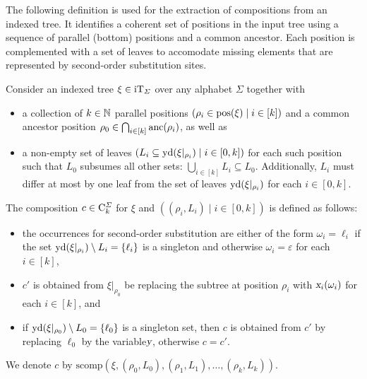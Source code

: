 \documentclass[../../document.tex]{subfiles}
\begin{document}
    The following definition is used for the extraction of  compositions from an indexed tree.
    It identifies a coherent set of positions in the input tree using a sequence of parallel (bottom) positions and a common ancestor.
    Each position is complemented with a set of leaves to accomodate missing elements that are represented by second-order substitution sites.

    \begin{definition}\label{def:dcp:comp}
        Consider an indexed tree \(\xi \in \operatorname{iT}_{\varSigma}\) over any alphabet \(\varSigma\) together with
        \begin{itemize}
            \item
                a collection of \(k \in \mathbb{N}\) parallel positions \((\rho_i \in \operatorname{pos}(\xi) \mid i \in [k])\) and
                a common ancestor position \(\rho_0 \in \bigcap_{i \in [k]} \operatorname{anc}(\rho_i)\), as well as
            \item
                a non-empty set of leaves \((L_i \subseteq \operatorname{yd}(\xi|_{\rho_i}) \mid i \in [0, k])\) for each such position such that
                \(L_0\) subsumes all other sets: \(\bigcup_{i\in[k]} L_i \subseteq L_0\). Additionally, \(L_i\) must differ at most by one leaf from the set of leaves \(\operatorname{yd}(\xi|_{\rho_i})\) for each \(i \in [0,k]\).
        \end{itemize}

        The  composition \(c \in \mathrm{C}^\varSigma_k\) for \(\xi\) and \(((\rho_i, L_i) \mid i \in [0,k])\) is defined as follows:
        \begin{itemize}
            \item
                the occurrences for second-order substitution are either of the form \(\omega_i = \ell_i\) if the set \(\operatorname{yd}(\xi|_{\rho_i}) \setminus L_i = \{\ell_i\}\) is a singleton and otherwise \(\omega_i = \varepsilon\) for each \(i \in [k]\),
            \item
                \(c'\) is obtained from \(\xi|_{\rho_0}\) be replacing the subtree at position
                \(\rho_i\) with \(\textsl{x}_i(\omega_i)\) for each \(i \in [k]\), and
            \item
                if \(\operatorname{yd}(\xi|_{\rho_0}) \setminus L_0 = \{\ell_0\}\) is a singleton set,
                then \(c\) is obtained from \(c'\) by replacing \(\ell_0\) by the variable\(\textsl{y}\), otherwise \(c = c'\).
        \end{itemize}
        We denote \(c\) by \(\mathrm{scomp}(\xi, (\rho_0, L_0), (\rho_1, L_1), \ldots, (\rho_k, L_k))\).
    \end{definition}
\end{document}
